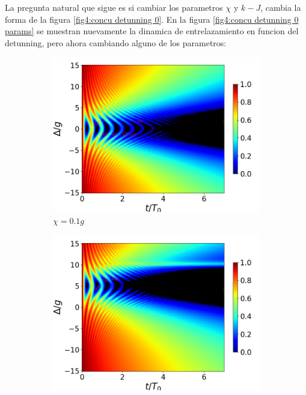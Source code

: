 La pregunta natural que sigue es si cambiar los parametros $\chi$ y $k-J$, cambia la forma de la figura \ref{fig4:concu detunning 0}. En la figura \ref{fig4:concu detunning 0 params} se muestran nuevamente la dinamica de entrelazamiento en funcion del detunning, pero ahora cambiando alguno de los parametros:

\begin{figure}[h]
    \centering
    \begin{subfigure}{0.49\textwidth}
        \includegraphics[width=\textwidth]{figuras/ch4/concu/delta/eg0+ge0 k=0.0g x=0.1g J=0.0g gamma=0.25g concu delta dis.png}
        \caption{$\chi=0.1g$}
        \label{fig4:concu detunning x1}
    \end{subfigure}
    \hfill
    \begin{subfigure}{0.49\textwidth}
        \includegraphics[width=\textwidth]{figuras/ch4/concu/delta/eg0+ge0 k=0.0g x=5.0g J=0.0g gamma=0.25g concu delta dis.png}

\end{subfigure}
\end{figure}
